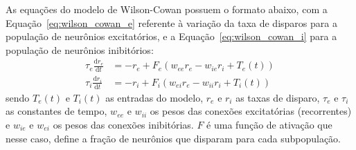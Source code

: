As equações do modelo de Wilson-Cowan possuem o formato abaixo, com a Equação~\ref{eq:wilson_cowan_e} referente à variação da taxa de disparos para a população de neurônios excitatórios, e a Equação~\ref{eq:wilson_cowan_i} para a população de neurônios inibitórios:
\begin{align}
	\tau_e\frac{\mathrm{d}r_e}{\mathrm{d}t} &=-r_e+F_e(w_{ee}r_e-w_{ie}r_i+T_e(t))\label{eq:wilson_cowan_e}\\
	\tau_i\frac{\mathrm{d}r_i}{\mathrm{d}t} &=-r_i+F_i(w_{ei}r_e-w_{ii}r_i+T_i(t))\label{eq:wilson_cowan_i}
\end{align}
sendo $T_e(t)$ e $T_i(t)$ as entradas do modelo, $r_e$ e $r_i$ as taxas de disparo, $\tau_e$ e $\tau_i$ as constantes de tempo, $w_{ee}$ e $w_{ii}$ os pesos das conexões excitatórias (recorrentes) e $w_{ie}$ e $w_{ei}$ os pesos das conexões inibitórias. $F$ é uma função de ativação que nesse caso, define a fração de neurônios que disparam para cada subpopulação.

